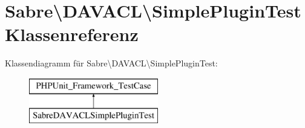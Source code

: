 \hypertarget{class_sabre_1_1_d_a_v_a_c_l_1_1_simple_plugin_test}{}\section{Sabre\textbackslash{}D\+A\+V\+A\+CL\textbackslash{}Simple\+Plugin\+Test Klassenreferenz}
\label{class_sabre_1_1_d_a_v_a_c_l_1_1_simple_plugin_test}
Klassendiagramm für Sabre\textbackslash{}D\+A\+V\+A\+CL\textbackslash{}Simple\+Plugin\+Test\+:\begin{figure}[H]
\begin{center}
\leavevmode
\includegraphics[height=2.000000cm]{class_sabre_1_1_d_a_v_a_c_l_1_1_simple_plugin_test}
\end{center}
\end{figure}

